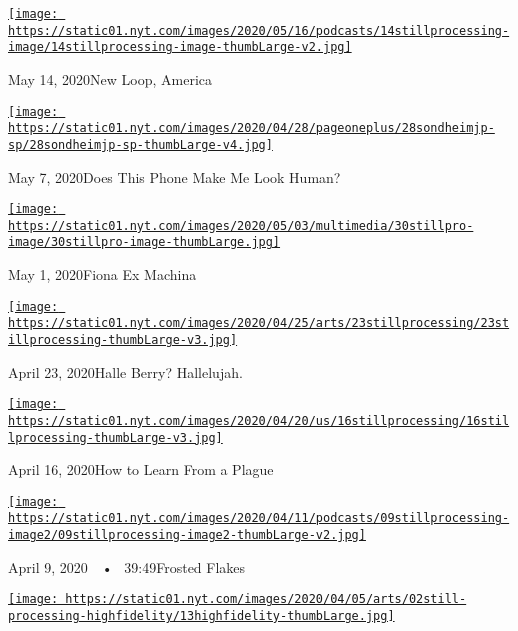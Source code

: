 \href{https://www.nytimes.com/2020/05/14/podcasts/still-processing-westworld-hollywood-utopia-dystopia.html?action=click\&module=audio-series-bar\&region=header\&pgtype=Article}{\texttt{[image: https://static01.nyt.com/images/2020/05/16/podcasts/14stillprocessing-image/14stillprocessing-image-thumbLarge-v2.jpg]}}

May 14, 2020New Loop, America

\href{https://www.nytimes.com/2020/05/07/podcasts/still-processing-internet-vulnerability-sondheim-parks-recreation.html?action=click\&module=audio-series-bar\&region=header\&pgtype=Article}{\texttt{[image: https://static01.nyt.com/images/2020/04/28/pageoneplus/28sondheimjp-sp/28sondheimjp-sp-thumbLarge-v4.jpg]}}

May 7, 2020Does This Phone Make Me Look Human?

\href{https://www.nytimes.com/2020/04/30/podcasts/still-processing-fiona-apple-fetch-bolt-cutters.html?action=click\&module=audio-series-bar\&region=header\&pgtype=Article}{\texttt{[image: https://static01.nyt.com/images/2020/05/03/multimedia/30stillpro-image/30stillpro-image-thumbLarge.jpg]}}

May 1, 2020Fiona Ex Machina

\href{https://www.nytimes.com/2020/04/23/podcasts/still-processing-halle-berry-sharon-stone-catwoman-quarantine.html?action=click\&module=audio-series-bar\&region=header\&pgtype=Article}{\texttt{[image: https://static01.nyt.com/images/2020/04/25/arts/23stillprocessing/23stillprocessing-thumbLarge-v3.jpg]}}

April 23, 2020Halle Berry? Hallelujah.

\href{https://www.nytimes.com/2020/04/16/podcasts/still-processing-AIDS-survive-coronavirus.html?action=click\&module=audio-series-bar\&region=header\&pgtype=Article}{\texttt{[image: https://static01.nyt.com/images/2020/04/20/us/16stillprocessing/16stillprocessing-thumbLarge-v3.jpg]}}

April 16, 2020How to Learn From a Plague

\href{https://www.nytimes.com/2020/04/09/podcasts/still-processing-tiger-king.html?action=click\&module=audio-series-bar\&region=header\&pgtype=Article}{\texttt{[image: https://static01.nyt.com/images/2020/04/11/podcasts/09stillprocessing-image2/09stillprocessing-image2-thumbLarge-v2.jpg]}}

April 9, 2020~~•~ 39:49Frosted Flakes

\href{https://www.nytimes.com/2020/04/02/podcasts/high-fidelity-zoe-kravitz.html?action=click\&module=audio-series-bar\&region=header\&pgtype=Article}{\texttt{[image: https://static01.nyt.com/images/2020/04/05/arts/02still-processing-highfidelity/13highfidelity-thumbLarge.jpg]}}

